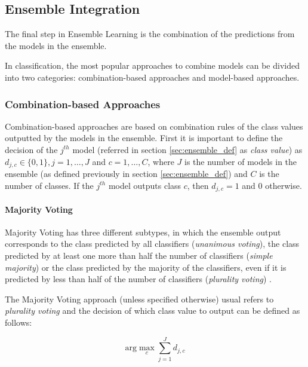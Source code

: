 \subsection{Ensemble Integration}\label{sec:ensemble_integration}

The final step in Ensemble Learning is the combination of the predictions from the models in the ensemble.

In classification, the most popular approaches to combine models can be divided into two categories: combination-based approaches and model-based approaches.

\subsubsection{Combination-based Approaches}

Combination-based approaches are based on combination rules of the class values outputted by the models in the ensemble.
First it is important to define the decision of the $j^{th}$ model (referred in section \ref{sec:ensemble_def} as \textit{class value}) as $d_{j,c} \in \{ 0,1 \}, j = 1, \dots, J$ and $c = 1, \dots, C$, where $J$ is the number of models in the ensemble (as defined previously in section \ref{sec:ensemble_def}) and $C$ is the number of classes.
If the $j^{th}$ model outputs class $c$, then $d_{j,c} = 1$ and 0 otherwise.

\paragraph{Majority Voting}\mbox{}

Majority Voting has three different subtypes, in which the ensemble output corresponds to the class predicted by all classifiers (\textit{unanimous voting}), the class predicted by at least one more than half the number of classifiers (\textit{simple majority}) or the class predicted by the majority  of the classifiers, even if it is predicted by less than half of the number of classifiers (\textit{plurality voting}) \cite{Polikar2012a}.

The Majority Voting approach (unless specified otherwise) usual refers to \textit{plurality voting} \cite{Polikar2012a} and the decision of which class value to output can be defined as follows: 

\begin{equation}\label{eq:majority}
\text{arg}\max_c \sum_{j = 1}^{J} d_{j,c}
\end{equation}

